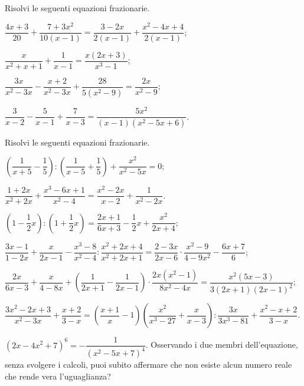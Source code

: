 \begin{esercizio}[\Ast]
\label{ese:17.31}
Risolvi le seguenti equazioni frazionarie.
\begin{enumeratea}
 \item $\dfrac{4x+3}{20}+\dfrac{7+3x^{2}}{10(x-1)}=\dfrac{3-2x}{2(x-1)}+\dfrac{x^{2}-4x+4}{2(x-1)}$;
 \item $\dfrac{x}{x^{2}+x+1}+\dfrac{1}{x-1}=\dfrac{x(2x+3)}{x^{3}-1}$;
 \item $\dfrac{3x}{x^{2}-3x}-\dfrac{x+2}{x^{2}-3x}+\dfrac{28}{5\left(x^{2}-9\right)}=\dfrac{2x}{x^{2}-9}$;
 \item $\dfrac{3}{x-2}-\dfrac{5}{x-1}+\dfrac{7}{x-3}=\dfrac{5x^{2}}{(x-1)\left(x^{2}-5x+6\right)}$.
\end{enumeratea}
\end{esercizio}

\begin{esercizio}[\Ast]
\label{ese:17.32}
Risolvi le seguenti equazioni frazionarie.
\begin{enumeratea}
 \item $\left(\dfrac{1}{x+5}-\dfrac{1}{5}\right):\left(\dfrac{1}{x-5}+\dfrac{1}{5}\right)+\dfrac{x^{2}}{x^{2}-5x}=0$;
 \item $\dfrac{1+2x}{x^{2}+2x}+\dfrac{x^{3}-6x+1}{x^{2}-4}=\dfrac{x^{2}-2x}{x-2}+\dfrac{1}{x^{2}-2x}$.
 \item $\left(1-\dfrac{1}{2}x\right):\left(1+\dfrac{1}{2}x\right)=\dfrac{2x+1}{6x+3}-\dfrac{1}{2}x+\dfrac{x^{2}}{2x+4}$;
 \item $\dfrac{3x-1}{1-2x}+\dfrac{x}{2x-1}-\dfrac{x^{3}-8}{x^{2}-4}:\dfrac{x^{2}+2x+4}{x^{2}+2x+1}=\dfrac{2-3x}{2x-6}\cdot {\dfrac{x^{2}-9}{4-9x^{2}}}-\dfrac{6x+7}{6}$;
 \item $\dfrac{2x}{6x-3}+\dfrac{x}{4-8x}+\left(\dfrac{1}{2x+1}-\dfrac{1}{2x-1}\right)\cdot {\dfrac{2x\left(x^{2}-1\right)}{8x^{2}-4x}}=\dfrac{x^{2}(5x-3)}{3(2x+1)(2x-1)^{2}}$;
 \item $\dfrac{3x^{2}-2x+3}{x^{2}-3x}+\dfrac{x+2}{3-x}=\left(\dfrac{x+1}{x}-1\right)\left(\dfrac{x^{2}}{x^{3}-27}+\dfrac{x}{x-3}\right):\dfrac{3x}{3x^{3}-81}+\dfrac{x^{2}-x+2}{3-x}$.
\end{enumeratea}
\end{esercizio}

\begin{esercizio}
\label{ese:17.33}
$\left(2x-4x^{2}+7\right)^{6}=-{\dfrac{1}{\left(x^{2}-5x+7\right)^{4}}}$. Osservando i due membri dell'equazione, senza svolgere i calcoli, puoi subito affermare che non esiste alcun numero reale che rende
vera l'uguaglianza?
\end{esercizio}

